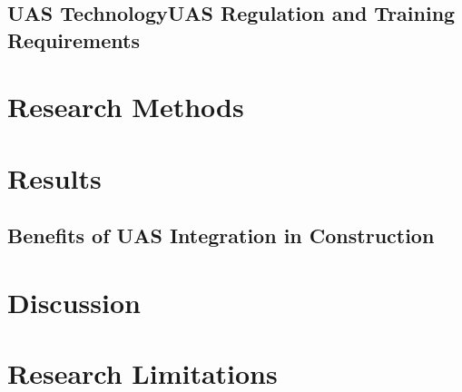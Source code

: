 \subsection{UAS TechnologyUAS Regulation and Training Requirements}
\section{Research Methods}
\section{Results}
\subsection{Benefits of UAS Integration in Construction}
\section{Discussion}
\section{Research Limitations}